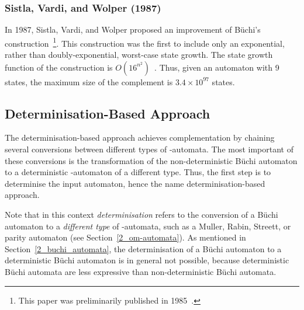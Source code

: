 
\subsubsection{Sistla, Vardi, and Wolper (1987)}
\label{2_svw87}
In 1987, Sistla, Vardi, and Wolper proposed an improvement of Büchi's construction~\cite{PrasadSistla1987217}\footnote{This paper was preliminarily published in 1985~\cite{1985_sistla}.}. This construction was the first to include only an exponential, rather than doubly-exponential, worst-case state growth. The state growth function of the construction is $O(16^{n^2})$~\cite{PrasadSistla1987217}. Thus, given an automaton with 9 states, the maximum size of the complement is $3.4 \times 10^{97}$ states. 




\subsection{Determinisation-Based Approach}
\label{2_determinisation-based}
The determinisation-based approach achieves complementation by chaining several conversions between different types of \om-automata. The most important of these conversions is the transformation of the non-deterministic Büchi automaton to a deterministic \om-automaton of a different type. Thus, the first step is to determinise the input automaton, hence the name determinisation-based approach.

Note that in this context \textit{determinisation} refers to the conversion of a Büchi automaton to a \textit{different type} of \om-automata, such as a Muller, Rabin, Streett, or parity automaton (see Section~\ref{2_om-automata}). As mentioned in Section~\ref{2_buchi_automata}, the determinisation of a Büchi automaton to a deterministic Büchi automaton is in general not possible, because deterministic Büchi automata are less expressive than non-deterministic Büchi automata.

